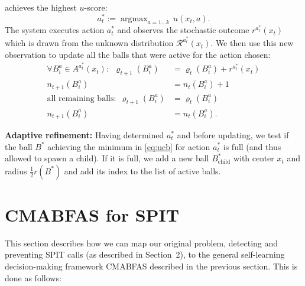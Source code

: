 \documentclass{llncs}
\newcommand{\argmax}{\mathop{\mathrm{argmax}}}
\begin{document}
achieves the highest $u$-score:
\begin{equation}
a^*_t:=\argmax_{a=1\ldots k} \, u(x_t,a).
\label{eq:bestaction} 
\end{equation}
The system executes action $a^*_t$ and observes the stochastic outcome $r^{a^*_t}(x_t)$
which is drawn from the unknown distribution $\mathcal R^{a^*_t}(x_t)$. We then use this
new observation to update all the balls that were active for the action chosen:
\begin{align*}
\forall B_i^a\in A^{a^*_t}(x_t): \ \ \varrho_{t+1}(B_i^a) & = \varrho_t(B_i^a)+r^{a^*_t}(x_t)\\
 n_{t+1}(B_i^a) & = n_t(B_i^a)+1 \\
 \text{all remaining balls:} \ \ \varrho_{t+1}(B_i^a) & = \varrho_t(B_i^a) \\
 n_{t+1}(B_i^a) & = n_t(B_i^a).
\end{align*}

{\bf \noindent Adaptive refinement:} Having determined $a^*_t$ and before updating, we test if 
the ball $B^*$ achieving the minimum in \eqref{eq:ucb} for action $a^*_t$ is full
(and thus allowed to spawn a child). If it is full, we add a new ball $B^*_{\text{child}}$
with center $x_t$ and radius $\frac{1}{2}r(B^*)$ and add its index to the list of active balls.



  
\section{CMABFAS for SPIT}
\label{sec:section5}
This section describes how we can map our original problem, detecting and preventing
SPIT calls (as described in Section~2), to the general self-learning 
decision-making framework CMABFAS described in the previous section. 
This is done as follows:
\end{document}
